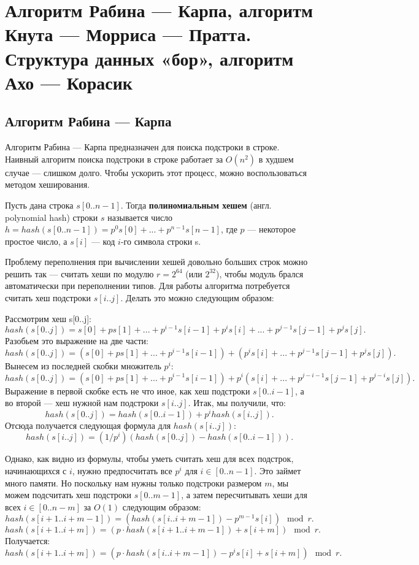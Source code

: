 \section{Алгоритм Рабина --- Карпа, алгоритм Кнута --- Морриса --- Пратта.  Структура данных «бор», алгоритм Ахо --- Корасик}

\subsection{Алгоритм Рабина --- Карпа}

Алгоритм Рабина --- Карпа предназначен для поиска подстроки в строке.
Наивный алгоритм поиска подстроки в строке работает за $O(n^2)$ в худшем случае --- слишком долго.
Чтобы ускорить этот процесс, можно воспользоваться методом хеширования.

\begin{definition}
    Пусть дана строка $s[0..n-1]$. Тогда \textbf{полиномиальным хешем} (англ. polynomial hash) строки $s$ называется число $h=hash(s[0..n-1])=p^0 s[0]+...+p^{n-1}s[n-1]$, где $p$ --- некоторое простое число, а $s[i]$ --- код $i$-го символа строки s.
\end{definition}

Проблему переполнения при вычислении хешей довольно больших строк можно решить так --- считать хеши по модулю $r=2^{64}$ (или $2^{32}$), чтобы модуль брался автоматически при переполнении типов.
Для работы алгоритма потребуется считать хеш подстроки $s[i..j]$.
Делать это можно следующим образом:

Рассмотрим хеш s[0..j]: $$hash(s[0..j])=s[0]+ps[1]+...+p^{i-1}s[i-1]+p^is[i]+...+p^{j-1}s[j-1]+p^js[j].$$
Разобьем это выражение на две части: $$hash(s[0..j])=(s[0]+ps[1]+...+p^{i-1}s[i-1])+(p^is[i]+...+p^{j-1}s[j-1]+p^js[j]).$$
Вынесем из последней скобки множитель $p^i$: $$hash(s[0..j])=(s[0]+ps[1]+...+p^{i-1}s[i-1])+p^i(s[i]+...+p^{j-i-1}s[j-1]+p^{j-i}s[j]).$$
Выражение в первой скобке есть не что иное, как хеш подстроки $s[0..i-1]$, а во второй --- хеш нужной нам подстроки $s[i..j]$.
Итак, мы получили, что: $$hash(s[0..j])=hash(s[0..i-1])+p^ihash(s[i..j]).$$
Отсюда получается следующая формула для $hash(s[i..j])$: $$hash(s[i..j])=(1/p^i)(hash(s[0..j])-hash(s[0..i-1])).$$

Однако, как видно из формулы, чтобы уметь считать хеш для всех подстрок, начинающихся с $i$, нужно предпосчитать все $p^i$ для $i \in [0..n-1]$.
Это займет много памяти.
Но поскольку нам нужны только подстроки размером $m$, мы можем подсчитать хеш подстроки $s[0..m-1]$, а затем пересчитывать хеши для всех $i \in [0..n-m]$ за $O(1)$ следующим образом: $$hash(s[i+1..i+m-1])=(hash(s[i..i+m-1])-p^{m-1}s[i])\mod r.$$
$$hash(s[i+1..i+m])=(p \cdot hash(s[i+1..i+m-1])+s[i+m])\mod r.$$
Получается: $$hash(s[i+1..i+m])=(p \cdot hash(s[i..i+m-1])-p^is[i]+s[i+m]) \mod r.$$


